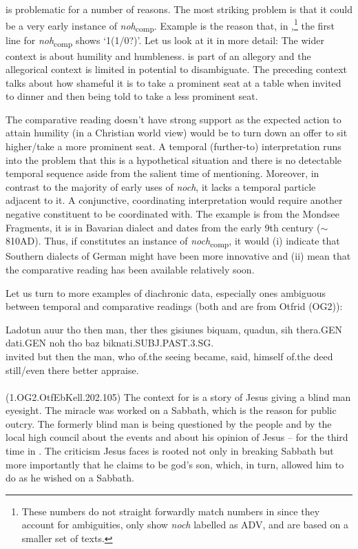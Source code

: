 \documentclass[output=paper,
modfonts
]{langscibook}
\begin{document}
 is problematic for a number of reasons. The most striking problem is that it could be a very early instance of \textit{noh}\textsubscript{comp}. Example  is the reason that, in ,\footnote{These numbers do not straight forwardly match numbers in  since they account for ambiguities, only show \textit{noch} labelled as ADV, and are based on a smaller set of texts.} the first line for \textit{noh}\textsubscript{comp} shows `1(1/0?)'. Let us look at it in more detail: The wider context is about humility and humbleness.  is part of an allegory and the allegorical context is limited in potential to disambiguate. The preceding context talks about how shameful it is to take a prominent seat at a table when invited to dinner and then being told to take a less prominent seat.

The comparative reading doesn't have strong support as the expected action to attain humility (in a Christian world view) would be to turn down an offer to sit higher/take a more prominent seat. A temporal (further-to) interpretation runs into the problem that this is a hypothetical situation and there is no detectable temporal sequence aside from the salient time of mentioning. Moreover, in contrast to the majority of early uses of \textit{noch}, it lacks a temporal particle adjacent to it. A conjunctive, coordinating interpretation would require another negative constituent to be coordinated with. The example is from the Mondsee Fragments, it is in Bavarian dialect and dates from the early 9th century ($\sim$ 810AD)\citep{annis_og}. Thus, if  constitutes an instance of \textit{noch}\textsubscript{comp}, it would (i) indicate that Southern dialects of German might have been more innovative and (ii) mean that the comparative reading has been available relatively soon.

Let us turn to more examples of diachronic data, especially ones ambiguous between temporal and comparative readings (both  and  are from Otfrid (OG2)):

\ea\gll Ladotun auur tho then man, ther thes gisiunes biquam, quadun, sih thera.GEN dati.GEN noh tho baz biknati.SUBJ.PAST.3.SG.\\
       invited but then the man, who of.the seeing became, said, himself of.the deed still/even there better appraise.\\
\label{OG2_noch_blind_man} \\  (1.OG2.OtfEbKell.202.105)
\z
The context for  is a story of Jesus giving a blind man eyesight. The miracle was worked on a Sabbath, which is the reason for public outcry. The formerly blind man is being questioned by the people and by the local high council about the events and about his opinion of Jesus -- for the third time in . The criticism Jesus faces is rooted not only in breaking Sabbath but more importantly that he claims to be god's son, which, in turn, allowed him to do as he wished on a Sabbath.
\end{document}
